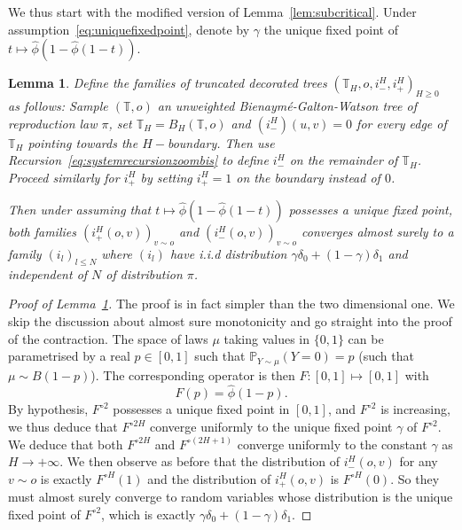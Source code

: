 \documentclass[11pt]{article}
\newtheorem{lemma}[prop]{Lemma}
\begin{document}
We thus start with the modified version of Lemma~\ref{lem:subcritical}. Under assumption~\eqref{eq:uniquefixedpoint}, denote by $\gamma$ the unique fixed point of $t \mapsto \hat{\phi} (1- \hat{\phi}(1-t))$.
\begin{lemma}\label{lem:subcriticalproj}
    Define the families of truncated decorated trees $\left(\mathbb{T}_H,o,i_{-}^{H},i_{+}^{H}\right)_{H \geq 0}$ as follows:
    Sample $(\mathbb{T},o)$ an unweighted Bienaymé-Galton-Watson tree of reproduction law $\pi$, set $\mathbb{T}_H=B_H(\mathbb{T},o)$ and   $(i_{-}^{H})(u,v)=0$ for every edge of $\mathbb{T}_H$ pointing towards the $H-$boundary. Then use Recursion~\eqref{eq:systemrecursionzoombis} to define $i_{-}^{H}$ on the remainder of $\mathbb{T}_H$. Proceed similarly for $i_{+}^{H}$ by setting $i_{+}^{H}=1$ on the boundary instead of $0$.

    Then under assuming that $t \mapsto \hat{\phi}(1-\hat{\phi}(1-t))$ possesses a unique fixed point, both families $(i_{+}^{H}(o,v))_{v \sim o}$ and $(i_{-}^{H}(o,v))_{v \sim o}$ converges almost surely to a family $(i_l)_{l \leq N}$ where $(i_l)$ have i.i.d distribution $\gamma\delta_0+(1-\gamma)\delta_1$ and independent of $N$ of distribution $\pi$.
\end{lemma}
\begin{proof}[Proof of Lemma~\ref{lem:subcriticalproj}]
    The proof is in fact simpler than the two dimensional one. We skip the discussion about almost sure monotonicity and go straight into the proof of the contraction. The space of laws $\mu$ taking values in $\{0,1\}$ can be parametrised by a real $p\in [0,1]$ such that $\mathbb{P}_{Y \sim \mu}(Y=0)=p$ (such that $\mu \sim B(1-p)$). The corresponding operator is then $F:[0,1]\mapsto [0,1]$ with
    \[ F(p)=\hat{\phi}(1-p). \]
    By hypothesis, $F^{\circ 2}$ possesses a unique fixed point in $[0,1]$, and $F^{\circ 2}$ is increasing, we thus deduce that $F^{\circ 2H}$ converge uniformly to the unique fixed point $\gamma$ of $F^{\circ 2}$. We deduce that both $F^{\circ 2H}$ and $F^{\circ (2H+1)}$ converge uniformly to the constant $\gamma$ as $H \rightarrow +\infty$. We then observe as before that the distribution of $i^{H}_-(o,v)$ for any $v \sim o $ is exactly $F^{\circ H}(1)$ and the distribution of $i_+^H(o,v)$ is $F^{\circ H}(0)$. So they must almost surely converge to random variables whose distribution is the unique fixed point of $F^{\circ 2}$, which is exactly $\gamma \delta_0 + (1-\gamma) \delta_1$.
\end{proof}
\end{document}
